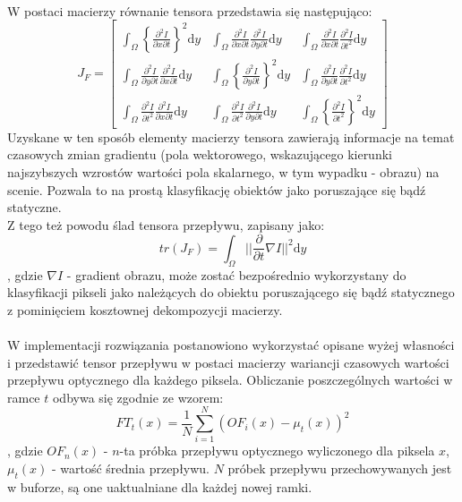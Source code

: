 \paragraph{}
W postaci macierzy równanie tensora przedstawia się następująco:
\begin{equation}
\label{eq:FT}
J_{F} =
\begin{bmatrix}
%
\int_\Omega \left\{\frac{\partial^2I}{\partial x\partial t}\right\}^2 \mathrm{d}y   &
%
\int_\Omega \frac{\partial^2I}{\partial x\partial t} \frac{\partial^2I}{\partial y\partial t} \mathrm{d}y  &
%
\int_\Omega \frac{\partial^2I}{\partial x\partial t} \frac{\partial^2I}{\partial t^2} \mathrm{d}y
\\[0.5em]
%
%
\int_\Omega \frac{\partial^2I}{\partial y\partial t} \frac{\partial^2I}{\partial x\partial t} \mathrm{d}y  &
%
\int_\Omega \left\{\frac{\partial^2I}{\partial y\partial t}\right\}^2 \mathrm{d}y   &
%
\int_\Omega \frac{\partial^2I}{\partial y\partial t} \frac{\partial^2I}{\partial t^2} \mathrm{d}y
\\[0.5em]
%
%
\int_\Omega \frac{\partial^2I}{\partial t^2} \frac{\partial^2I}{\partial x\partial t} \mathrm{d}y   &
%
\int_\Omega \frac{\partial^2I}{\partial t^2} \frac{\partial^2I}{\partial y\partial t} \mathrm{d}y   &
%
\int_\Omega \left\{\frac{\partial^2I}{\partial t^2}\right\}^2 \mathrm{d}y
\end{bmatrix}
\end{equation}
Uzyskane w ten sposób elementy macierzy tensora zawierają informacje na temat czasowych zmian gradientu (pola wektorowego, wskazującego kierunki najszybszych wzrostów wartości pola skalarnego, w tym wypadku - obrazu) na scenie. Pozwala to na prostą klasyfikację obiektów jako poruszające się bądź statyczne.\\
Z tego też powodu ślad tensora przepływu, zapisany jako:
\begin{equation}
tr(J_{F}) = 
\int_\Omega ||\frac{\partial}{\partial t}\nabla I||^2\mathrm{d}y
\end{equation}
, gdzie $\nabla I$ - gradient obrazu, może zostać bezpośrednio wykorzystany do klasyfikacji pikseli jako należących do obiektu poruszającego się bądź statycznego z pominięciem kosztownej dekompozycji macierzy.
\paragraph{}
W implementacji rozwiązania postanowiono wykorzystać opisane wyżej własności i przedstawić tensor przepływu w postaci macierzy wariancji czasowych wartości przepływu optycznego dla każdego piksela. Obliczanie poszczególnych wartości w ramce $t$ odbywa się zgodnie ze wzorem:
\begin{equation}
FT_{t}(x) = \frac{1}{N}\sum_{i=1}^{N} (OF_{i}(x)-\mu_{t}(x))^2
\end{equation}
, gdzie $OF_{n}(x)$ - $n$-ta próbka przepływu optycznego wyliczonego dla piksela $x$, $\mu_{t}(x)$ - wartość średnia przepływu. $N$ próbek przepływu przechowywanych jest w buforze, są one uaktualniane dla każdej nowej ramki.
